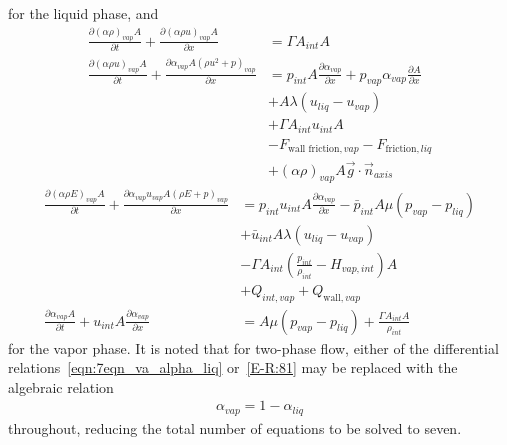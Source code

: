 \begin{itemize}
for the liquid phase, and
\begin{align}
  \frac{\partial \left( \alpha \rho \right)_{vap} A}{\partial t}
  + \frac{\partial \left( \alpha \rho u \right)_{vap} A}{\partial x}
  &=  \Gamma A_{int} A
  \\
  \nonumber
  \frac{\partial \left( \alpha \rho u \right)_{vap} A}{\partial t}
  + \frac{\partial \alpha_{vap} A \left( \rho u^2 + p \right)_{vap} }{\partial x}
  &= p_{int} A \frac{\partial \alpha_{vap}}{\partial x} + p_{vap} \alpha_{vap} \frac{\partial A}{\partial x}
  \\
  \nonumber
  &+ A \lambda (u_{liq} - u_{vap})
  \\
  \nonumber
  &+ \Gamma A_{int} u_{int} A
  \\
  \nonumber
  &- F_{\text{wall friction}, vap} - F_{\text{friction}, liq}
  \\
  &+ \left( \alpha \rho \right)_{vap} A \vec{g} \cdot \vec{n}_{axis}
\end{align}
\begin{align}
  \nonumber
  \frac{\partial \left( \alpha \rho E \right)_{vap} A}{\partial t}
  + \frac{\partial \alpha_{vap} u_{vap} A \left( \rho E + p \right)_{vap}}{\partial x}
  &= p_{int} u_{int} A \frac{\partial \alpha_{vap}}{\partial x} - \bar{p}_{int} A \mu (p_{vap} - p_{liq})
  \\
  \nonumber
  &+ \bar{u}_{int} A \lambda (u_{liq} - u_{vap})
  \\
  \nonumber
  &- \Gamma A_{int} \left( \frac{p_{int}}{\rho_{int}} - H_{vap, int} \right) A
  \\
  &+ Q_{int, vap} + Q_{\text{wall}, vap}
  \\
  \label{E-R:81}
  \frac{\partial \alpha_{vap} A}{\partial t} + u_{int} A \frac{\partial \alpha_{vap}}{\partial x}
  &= A \mu (p_{vap} - p_{liq}) + \frac{\Gamma A_{int} A}{\rho_{int}}
\end{align}
for the vapor phase.  It is noted that for two-phase flow,
either of the differential relations~\eqref{eqn:7eqn_va_alpha_liq}
or~\eqref{E-R:81} may be replaced with the algebraic relation
\begin{align}
 \alpha_{vap}= 1 - \alpha_{liq}
\end{align}
throughout, reducing the total number of equations to be solved to seven.


\end{itemize}
